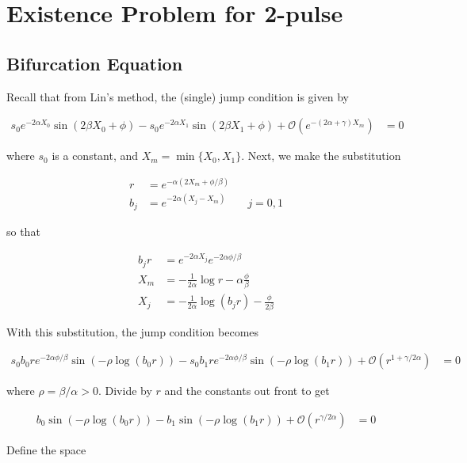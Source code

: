 \documentclass[12pt]{article}
\begin{document}
\section{Existence Problem for 2-pulse}

\subsection{Bifurcation Equation}

Recall that from Lin's method, the (single) jump condition is given by

\begin{align}\label{jumpcond1}
s_0 e^{-2 \alpha X_0} \sin(2 \beta X_0 + \phi) - s_0 e^{-2 \alpha X_1} \sin(2 \beta X_1 + \phi) + \mathcal{O}(e^{-(2 \alpha + \gamma) X_m}) &= 0
\end{align}

where $s_0$ is a constant, and $X_m = \min\{X_0,X_1\}$. Next, we make the substitution

\begin{align}
r &= e^{-\alpha(2 X_m + \phi/\beta)} \\
b_j &= e^{-2 \alpha(X_j - X_m)} && j = 0, 1
\end{align}

so that

\begin{align*}
b_j r &= e^{-2 \alpha X_j}e^{-2\alpha \phi/\beta} \\
X_m &= -\frac{1}{2\alpha}\log r - \alpha \frac{\phi}{\beta} \\
X_j &= -\frac{1}{2\alpha}\log(b_j r) - \frac{\phi}{2 \beta} 
\end{align*}

With this substitution, the jump condition becomes

\begin{align*}
s_0 b_0 r e^{-2\alpha \phi/\beta} \sin(-\rho \log(b_0 r)) - s_0 b_1 r e^{-2\alpha \phi/\beta} \sin(-\rho \log(b_1 r)) + \mathcal{O}(r^{1 + \gamma / 2 \alpha}) &= 0
\end{align*}

where $\rho = \beta / \alpha > 0$. Divide by $r$ and the constants out front to get

\begin{align}\label{jumpcond2}
b_0 \sin(-\rho \log(b_0 r)) - b_1 \sin(-\rho \log(b_1 r)) + \mathcal{O}(r^{\gamma / 2 \alpha}) &= 0
\end{align}

Define the space
\end{document}
